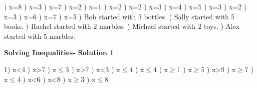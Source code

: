 \documentclass{article}%
\begin{document}
) x=8%
) x=3%
) x=7%
) x=2%
) x=1%
) x=2%
) x=2%
) x=3%
) x=4%
) x=5%
) x=3%
) x=2%
) x=3%
) x=6%
) x=7%
) x=5%
) Bob started with 3 bottles.%
) Sally started with 5 books.%
) Rachel started with 2 marbles.%
) Michael started with 2 toys.%
) Alex started with 5 marbles.%
\newline%
\newpage%
\large%
\begin{center}%
\textbf{Solving Inequalities- Solution 1}%
\newline%
\end{center} \normalsize%
1) x<4%
) x>7%
) x$\leq$3%
) x>7%
) x<3%
) x$\leq$4%
) x$\leq$4%
) x$\geq$1%
) x$\geq$5%
) x>9%
) x$\geq$7%
) x$\leq$4%
) x<6%
) x<8%
) x$\geq$3%
) x$\leq$8%
\newline%
\end{document}
